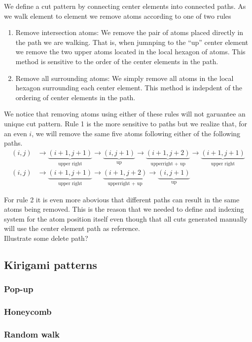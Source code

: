 We define a cut pattern by connecting center elements into connected paths. As
we walk element to element we remove atoms according to one of two rules 
\begin{enumerate}
  \item Remove intersection atoms: We remove the pair of atoms placed directly
  in the path we are walking. That is, when jumnping to the ``up'' center
  element we remove the two upper atoms located in the local hexagon of atoms.
  This method is sensitive to the order of the center elements in the path. 
  \item Remove all surrounding atoms: We simply remove all atoms in the local
  hexagon surrounding each center element. This method is indepdent of the
  ordering of center elements in the path.
\end{enumerate}

We notice that removing atoms using either of these rules will not garuantee an
unique cut pattern. Rule 1 is the more sensitive to paths but we realize that,
for an even $i$, we will remove the same five atoms following either of the
following paths.
\begin{align*}
  (i, j) &\rightarrow \underbrace{(i+1,j+1)}_{\text{upper right}} \rightarrow \underbrace{(i, j+1)}_{\text{up}} \rightarrow \underbrace{(i+1, j+2)}_{\text{upperright + up}} \rightarrow \underbrace{(i+1, j+1)}_{\text{upper right}} \\
  (i, j) &\rightarrow \underbrace{(i+1,j+1)}_{\text{upper right}} \rightarrow \underbrace{(i+1, j+2)}_{\text{upperright + up}} \rightarrow \underbrace{(i, j+1)}_{\text{up}}
\end{align*}

For rule 2 it is even more abovious that different paths can result in the same
atoms being removed. This is the reason that we needed to define and indexing
system for the atom position itself even though that all cuts generated manually
will use the center element path as reference. \\

Illustrate some delete path?



\subsection{Kirigami patterns}
\subsubsection{Pop-up}
\subsubsection{Honeycomb}
\subsubsection{Random walk}




